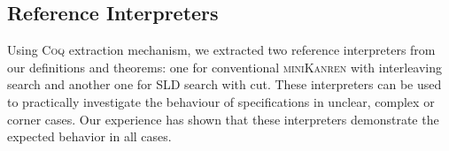 \subsection{Reference Interpreters}

Using \textsc{Coq} extraction mechanism, we extracted two reference interpreters from our definitions and theorems: one for conventional
\textsc{miniKanren} with interleaving search and another one for SLD search with cut. These interpreters can be used to practically investigate the behaviour
of specifications in unclear, complex or corner cases. Our experience has shown that these interpreters demonstrate the expected behavior
in all cases.
